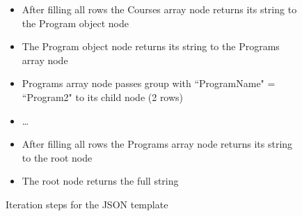 \begin{figure}[]
\begin{itemize}
        \item After filling all rows the Courses array node returns its string to the Program object node
        \item The Program object node returns its string to the Programs array node
        \item Programs array node passes group with ``ProgramName" = ``Program2" to its child node (2 rows)
        \item \dots
        \item After filling all rows the Programs array node returns its string to the root node
        \item The root node returns the full string
    \end{itemize}
    \caption{Iteration steps for the JSON template}
    \label{itemize:json_iteration}
\end{figure}
